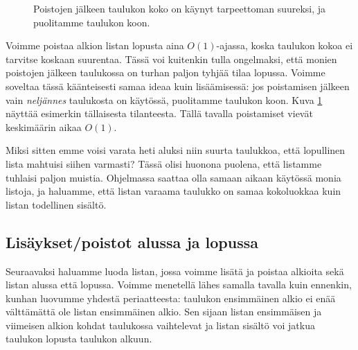 \begin{figure}
\center
{}
\caption{Poistojen jälkeen taulukon koko on käynyt tarpeettoman suureksi,
ja puolitamme taulukon koon.}                                                                        
\label{fig:lispoi}
\end{figure}

Voimme poistaa alkion listan lopusta aina $O(1)$-ajassa,
koska taulukon kokoa ei tarvitse koskaan suurentaa.
Tässä voi kuitenkin tulla ongelmaksi, että monien poistojen
jälkeen taulukossa on turhan paljon tyhjää tilaa lopussa.
Voimme soveltaa tässä käänteisesti samaa ideaa kuin lisäämisessä:
jos poistamisen jälkeen vain \emph{neljännes} taulukosta on käytössä,
puolitamme taulukon koon.
Kuva \ref{fig:lispoi} näyttää esimerkin tällaisesta tilanteesta.
Tällä tavalla poistamiset vievät keskimäärin aikaa $O(1)$.

Miksi sitten emme voisi varata heti aluksi niin suurta taulukkoa,
että lopullinen lista mahtuisi siihen varmasti?
Tässä olisi huonona puolena, että listamme tuhlaisi paljon muistia.
Ohjelmassa saattaa olla samaan aikaan käytössä monia listoja,
ja haluamme, että listan varaama taulukko on samaa kokoluokkaa
kuin listan todellinen sisältö.

\subsection{Lisäykset/poistot alussa ja lopussa}

Seuraavaksi haluamme luoda listan,
jossa voimme lisätä ja poistaa alkioita
sekä listan alussa että lopussa.
Voimme menetellä lähes samalla tavalla kuin ennenkin,
kunhan luovumme yhdestä periaatteesta:
taulukon ensimmäinen alkio ei enää välttämättä
ole listan ensimmäinen alkio.
Sen sijaan listan ensimmäisen ja
viimeisen alkion kohdat taulukossa vaihtelevat ja listan sisältö
voi jatkua taulukon lopusta taulukon alkuun.

